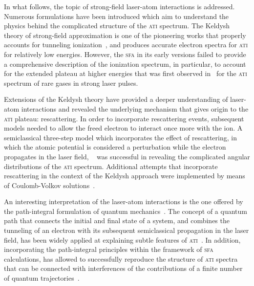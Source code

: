 


In what follows, the topic of strong-field laser-atom interactions is
addressed. Numerous formulations have been introduced which aim to
understand the physics behind the complicated structure of the
\textsc{ati} spectrum.  The Keldysh theory of strong-field
approximation is one of the pioneering works that properly accounts
for tunneling ionization~\cite{KeldyshSFA}, and produces accurate
electron spectra for \textsc{ati} for relatively low
energies. However, the \textsc{sfa} in its early versions failed to
provide a comprehensive description of the ionization spectrum, in
particular, to account for the extended plateau at higher energies
that was first observed in~\cite{Paulus_1994plateau} for the
\textsc{ati} spectrum of rare gases in strong laser pulses.

Extensions of the Keldysh theory have provided a deeper understanding
of laser-atom interactions and revealed the underlying mechanism that
gives origin to the \textsc{ati} plateau: rescattering. In order to
incorporate rescattering events, subsequent models needed to allow the
freed electron to interact once more with the ion. A semiclassical
three-step model which incorporates the effect of rescattering, in
which the atomic potential is considered a perturbation while the
electron propagates in the laser field,
~\cite{Becker_rescattering1994,Becker_1994plateau_classical} was
successful in revealing the complicated angular distributions of the
\textsc{ati} spectrum. Additional attempts that incorporate
rescattering in the context of the Keldysh approach were implemented
by means of Coulomb-Volkov solutions~\cite{Kaminski_1997}.


An interesting interpretation of the laser-atom interactions is the
one offered by the path-integral formulation of quantum
mechanics~\cite{RevModPhysFeynman}. The concept of a quantum path that
connects the initial and final state of a system, and combines the
tunneling of an electron with its subsequent semiclassical propagation
in the laser field, has been widely applied at explaining subtle
features of \textsc{ati}~\cite{LewScience2001}. In addition,
incorporating the path-integral principles within the framework of
\textsc{sfa} calculations, has allowed to successfully reproduce the
structure of \textsc{ati} spectra that can be connected with
interferences of the contributions of a finite number of quantum
trajectories~\cite{KopoldOptComm2000}.


